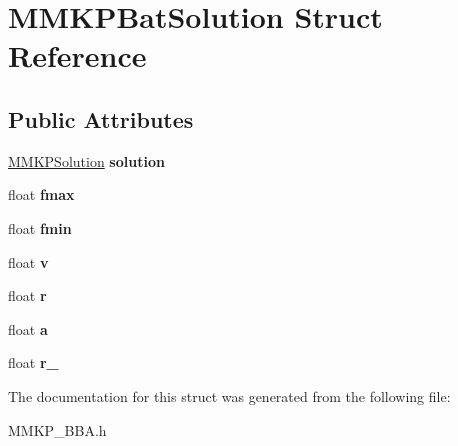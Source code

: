 \hypertarget{struct_m_m_k_p_bat_solution}{\section{M\+M\+K\+P\+Bat\+Solution Struct Reference}
\label{struct_m_m_k_p_bat_solution}
}
\subsection*{Public Attributes}
\begin{DoxyCompactItemize}
\item 
\hypertarget{struct_m_m_k_p_bat_solution_a2642a61440f4996e4dfd57ae9e08531a}{\hyperlink{class_m_m_k_p_solution}{M\+M\+K\+P\+Solution} {\bfseries solution}}\label{struct_m_m_k_p_bat_solution_a2642a61440f4996e4dfd57ae9e08531a}

\item 
\hypertarget{struct_m_m_k_p_bat_solution_a51eba1b4c0e6e90352fb865dacc88672}{float {\bfseries fmax}}\label{struct_m_m_k_p_bat_solution_a51eba1b4c0e6e90352fb865dacc88672}

\item 
\hypertarget{struct_m_m_k_p_bat_solution_a3eaaabb2bae75a98682ac18f0395a16b}{float {\bfseries fmin}}\label{struct_m_m_k_p_bat_solution_a3eaaabb2bae75a98682ac18f0395a16b}

\item 
\hypertarget{struct_m_m_k_p_bat_solution_a2d8ed1614b6be9a1417e3743fcaf3370}{float {\bfseries v}}\label{struct_m_m_k_p_bat_solution_a2d8ed1614b6be9a1417e3743fcaf3370}

\item 
\hypertarget{struct_m_m_k_p_bat_solution_a5989292ce39bae0f449b71eff8b320fa}{float {\bfseries r}}\label{struct_m_m_k_p_bat_solution_a5989292ce39bae0f449b71eff8b320fa}

\item 
\hypertarget{struct_m_m_k_p_bat_solution_af6cb17c4270d545c5facb142f9a7d446}{float {\bfseries a}}\label{struct_m_m_k_p_bat_solution_af6cb17c4270d545c5facb142f9a7d446}

\item 
\hypertarget{struct_m_m_k_p_bat_solution_a45898f3399c37ca338b793fdb75af87c}{float {\bfseries r\+\_}}\label{struct_m_m_k_p_bat_solution_a45898f3399c37ca338b793fdb75af87c}

\end{DoxyCompactItemize}


The documentation for this struct was generated from the following file\+:\begin{DoxyCompactItemize}
\item 
M\+M\+K\+P\+\_\+\+B\+B\+A.\+h\end{DoxyCompactItemize}
